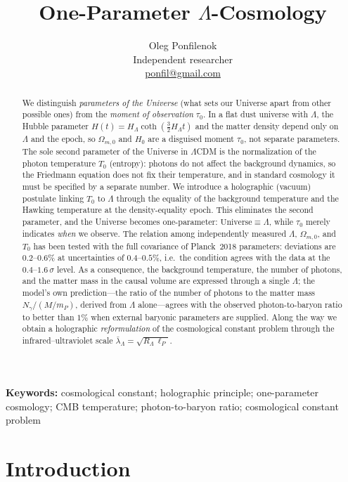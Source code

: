 \documentclass[10pt,a4paper]{article}
\title{One-Parameter $\Lambda$-Cosmology}
\author{Oleg Ponfilenok\\
Independent researcher\\
\href{mailto:ponfil@gmail.com}{ponfil@gmail.com}}
\date{}
\begin{document}
\maketitle

\begin{abstract}
We distinguish \emph{parameters of the Universe} (what sets our Universe apart from other possible ones) from the \emph{moment of observation} $\tau_0$. In a flat dust universe with $\Lambda$, the Hubble parameter $H(t)=H_\Lambda\coth(\tfrac32 H_\Lambda t)$ and the matter density depend only on $\Lambda$ and the epoch, so $\Omega_{m,0}$ and $H_0$ are a disguised moment $\tau_0$, not separate parameters. The sole second parameter of the Universe in $\Lambda$CDM is the normalization of the photon temperature $T_0$ (entropy): photons do not affect the background dynamics, so the Friedmann equation does not fix their temperature, and in standard cosmology it must be specified by a separate number. We introduce a holographic (vacuum) postulate linking $T_0$ to $\Lambda$ through the equality of the background temperature and the Hawking temperature at the density-equality epoch. This eliminates the second parameter, and the Universe becomes one-parameter: $\text{Universe}\equiv\Lambda$, while $\tau_0$ merely indicates \emph{when} we observe. The relation among independently measured $\Lambda$, $\Omega_{m,0}$, and $T_0$ has been tested with the full covariance of Planck~2018 parameters: deviations are $0.2$--$0.6\%$ at uncertainties of $0.4$--$0.5\%$, i.e.\ the condition agrees with the data at the $0.4$--$1.6\,\sigma$ level. As a consequence, the background temperature, the number of photons, and the matter mass in the causal volume are expressed through a single $\Lambda$; the model's own prediction---the ratio of the number of photons to the matter mass $N_\gamma/(M/m_P)$, derived from $\Lambda$ alone---agrees with the observed photon-to-baryon ratio to better than $1\%$ when external baryonic parameters are supplied. Along the way we obtain a holographic \emph{reformulation} of the cosmological constant problem through the infrared--ultraviolet scale $\bar\lambda_\Lambda=\sqrt{R_\Lambda\,\ell_P}$.
\end{abstract}

\noindent\textbf{Keywords:} cosmological constant; holographic principle; one-parameter cosmology; CMB temperature; photon-to-baryon ratio; cosmological constant problem

\section{Introduction}
\end{document}
